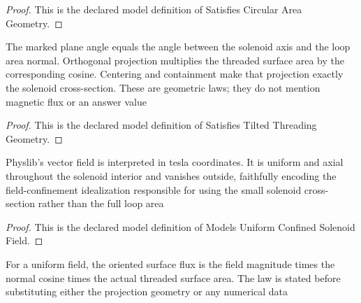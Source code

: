 \begin{proof}
  This is the declared model definition of Satisfies Circular Area Geometry.
\end{proof}
\begin{definition}
  \label{def:physics:phyx-mini-0925:phyxminiproblems-problemphyxmini0925-satisfiestiltedthreadinggeometry}
  The marked plane angle equals the angle between the solenoid axis and the loop area normal. Orthogonal projection multiplies the threaded surface area by the corresponding cosine. Centering and containment make that projection exactly the solenoid cross-section. These are geometric laws; they do not mention magnetic flux or an answer value
\end{definition}
\begin{proof}
  This is the declared model definition of Satisfies Tilted Threading Geometry.
\end{proof}
\begin{definition}
  \label{def:physics:phyx-mini-0925:phyxminiproblems-problemphyxmini0925-modelsuniformconfinedsolenoidfield}
  Physlib's vector field is interpreted in tesla coordinates. It is uniform and axial throughout the solenoid interior and vanishes outside, faithfully encoding the field-confinement idealization responsible for using the small solenoid cross-section rather than the full loop area
\end{definition}
\begin{proof}
  This is the declared model definition of Models Uniform Confined Solenoid Field.
\end{proof}
\begin{definition}
  \label{def:physics:phyx-mini-0925:phyxminiproblems-problemphyxmini0925-satisfiesuniformmagneticsurfacefluxlaw}
  For a uniform field, the oriented surface flux is the field magnitude times the normal cosine times the actual threaded surface area. The law is stated before substituting either the projection geometry or any numerical data
\end{definition}

